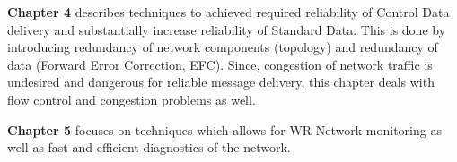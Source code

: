 \textbf{Chapter 4} describes techniques to achieved required reliability of
Control Data delivery and substantially increase reliability of Standard Data.
This is done by introducing redundancy of network components (topology) and
redundancy of data (Forward Error Correction, EFC). Since, congestion of network
traffic is undesired and dangerous for reliable message delivery, this chapter
deals with flow control and congestion problems as well. 

\textbf{Chapter 5} focuses on techniques which allows for WR Network
monitoring as well as fast and efficient diagnostics of the network.

